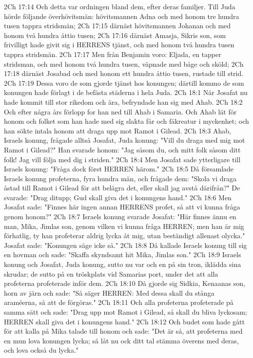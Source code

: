2Ch 17:14  Och detta var ordningen bland dem, efter deras familjer. Till Juda hörde följande överhövitsmän: hövitsmannen Adna och med honom tre hundra tusen tappra stridsmän;
2Ch 17:15  därnäst hövitsmannen Johanan och med honom två hundra åttio tusen;
2Ch 17:16  därnäst Amasja, Sikris son, som frivilligt hade givit sig i HERRENS tjänst, och med honom två hundra tusen tappra stridsmän.
2Ch 17:17  Men från Benjamin voro: Eljada, en tapper stridsman, och med honom två hundra tusen, väpnade med båge och sköld;
2Ch 17:18  därnäst Josabad och med honom ett hundra åttio tusen, rustade till strid.
2Ch 17:19  Dessa voro de som gjorde tjänst hos konungen; därtill kommo de som konungen hade förlagt i de befästa städerna i hela Juda.
2Ch 18:1  När Josafat nu hade kommit till stor rikedom och ära, befryndade han sig med Ahab.
2Ch 18:2  Och efter några års förlopp for han ned till Ahab i Samaria. Och Ahab lät för honom och folket som han hade med sig slakta får och fäkreatur i myckenhet; och han sökte intala honom att draga upp mot Ramot i Gilead.
2Ch 18:3  Ahab, Israels konung, frågade alltså Josafat, Juda konung: "Vill du draga med mig mot Ramot i Gilead?" Han svarade honom: "Jag såsom du, och mitt folk såsom ditt folk! Jag vill följa med dig i striden."
2Ch 18:4  Men Josafat sade ytterligare till Israels konung: "Fråga dock först HERREN härom."
2Ch 18:5  Då församlade Israels konung profeterna, fyra hundra män, och frågade dem: "Skola vi draga åstad till Ramot i Gilead för att belägra det, eller skall jag avstå därifrån?" De svarade: "Drag ditupp; Gud skall giva det i konungens hand."
2Ch 18:6  Men Josafat sade: "Finnes här ingen annan HERRENS profet, så att vi kunna fråga genom honom?"
2Ch 18:7  Israels konung svarade Josafat: "Här finnes ännu en man, Mika, Jimlas son, genom vilken vi kunna fråga HERREN; men han är mig förhatlig, ty han profeterar aldrig lycka åt mig, utan beständigt allenast olycka." Josafat sade: "Konungen säge icke så."
2Ch 18:8  Då kallade Israels konung till sig en hovman och sade: "Skaffa skyndsamt hit Mika, Jimlas son."
2Ch 18:9  Israels konung och Josafat, Juda konung, sutto nu var och en på sin tron, iklädda sina skrudar; de sutto på en tröskplats vid Samarias port, under det att alla profeterna profeterade inför dem.
2Ch 18:10  Då gjorde sig Sidkia, Kenaanas son, horn av järn och sade: "Så säger HERREN: Med dessa skall du stånga araméerna, så att de förgöras."
2Ch 18:11  Och alla profeterna profeterade på samma sätt och sade: "Drag upp mot Ramot i Gilead, så skall du bliva lyckosam; HERREN skall giva det i konungens hand."
2Ch 18:12  Och budet som hade gått för att kalla på Mika talade till honom och sade: "Det är så, att profeterna med en mun lova konungen lycka; så låt nu ock ditt tal stämma överens med deras, och lova också du lycka."

